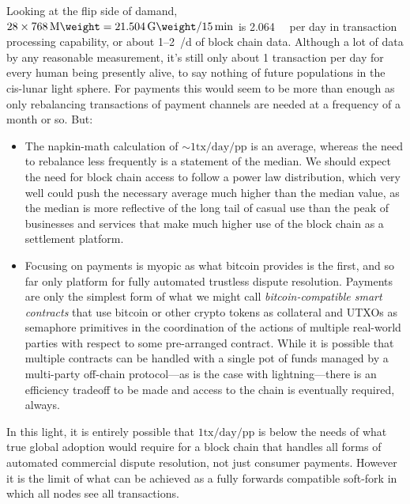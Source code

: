 Looking at the flip side of damand, $28 \times \SI{768}{\mega\weight}
= \SI{21.504}{\giga\weight} / \SI{15}{\min}$ is
\SI{2.064}{\tera\weight} per day in transaction processing capability,
or about \numrange{1}{2}\si[per-mode=symbol]{\tera\byte\per\day} of
block chain data.  Although a lot of data by any reasonable
measurement, it's still only about \num{1} transaction per day for
every human being presently alive, to say nothing of future
populations in the cis-lunar light sphere.  For payments this would
seem to be more than enough as only rebalancing transactions of
payment channels are needed at a frequency of a month or so.  But:

\begin{itemize}
  \item

    The napkin-math calculation of
    $\sim1\mathrm{tx}/\mathrm{day}/\mathrm{pp}$ is an average, whereas
    the need to rebalance less frequently is a statement of the
    median.  We should expect the need for block chain access to
    follow a power law distribution, which very well could push the
    necessary average much higher than the median value, as the median
    is more reflective of the long tail of casual use than the peak of
    businesses and services that make much higher use of the block
    chain as a settlement platform.

  \item

    Focusing on payments is myopic as what bitcoin provides is the
    first, and so far only platform for fully automated trustless
    dispute resolution.  Payments are only the simplest form of what
    we might call \emph{bitcoin-compatible smart contracts} that use
    bitcoin or other crypto tokens as collateral and UTXOs as
    semaphore primitives in the coordination of the actions of
    multiple real-world parties with respect to some pre-arranged
    contract.  While it is possible that multiple contracts can be
    handled with a single pot of funds managed by a multi-party
    off-chain protocol---as is the case with lightning---there is an
    efficiency tradeoff to be made and access to the chain is
    eventually required, always.

\end{itemize}

In this light, it is entirely possible that
$1\mathrm{tx}/\mathrm{day}/\mathrm{pp}$ is below the needs of what
true global adoption would require for a block chain that handles all
forms of automated commercial dispute resolution, not just consumer
payments.  However it is the limit of what can be achieved as a fully
forwards compatible soft-fork in which all nodes see all transactions.


